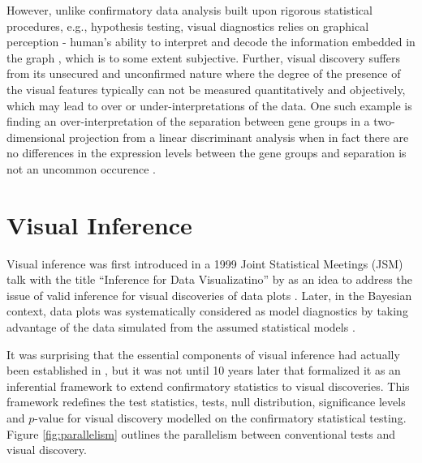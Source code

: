 \documentclass{monashthesis}
\theoremstyle{definition}
\theoremstyle{definition}
\theoremstyle{definition}
\theoremstyle{definition}
\theoremstyle{remark}
\begin{document}
However, unlike confirmatory data analysis built upon rigorous statistical procedures, e.g., hypothesis testing, visual diagnostics relies on graphical perception - human's ability to interpret and decode the information embedded in the graph \autocite{cleveland_graphical_1984}, which is to some extent subjective. Further, visual discovery suffers from its unsecured and unconfirmed nature where the degree of the presence of the visual features typically can not be measured quantitatively and objectively, which may lead to over or under-interpretations of the data. One such example is finding an over-interpretation of the separation between gene groups in a two-dimensional projection from a linear discriminant analysis when in fact there are no differences in the expression levels between the gene groups and separation is not an uncommon occurence \autocite{roy_chowdhury_using_2015}.

\hypertarget{se:vi}{%
\section{Visual Inference}\label{se:vi}}

Visual inference was first introduced in a 1999 Joint Statistical Meetings (JSM) talk with the title ``Inference for Data Visualizatino'' by \textcite{buja_inference_1999} as an idea to address the issue of valid inference for visual discoveries of data plots \autocite{gelman_exploratory_2004}. Later, in the Bayesian context, data plots was systematically considered as model diagnostics by taking advantage of the data simulated from the assumed statistical models \autocite{gelman_bayesian_2003,gelman_exploratory_2004}.

It was surprising that the essential components of visual inference had actually been established in \textcite{buja_inference_1999}, but it was not until 10 years later that \textcite{buja_statistical_2009} formalized it as an inferential framework to extend confirmatory statistics to visual discoveries. This framework redefines the test statistics, tests, null distribution, significance levels and \(p\)-value for visual discovery modelled on the confirmatory statistical testing. Figure \ref{fig:parallelism} outlines the parallelism between conventional tests and visual discovery.
\end{document}
